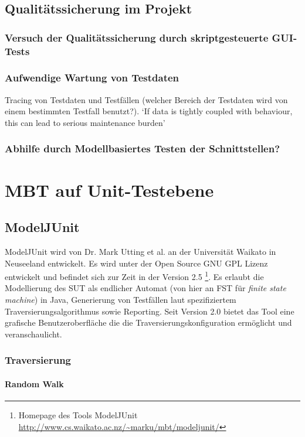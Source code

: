 \subsection{Qualitätssicherung im Projekt}
\subsubsection{Versuch der Qualitätssicherung durch skriptgesteuerte GUI-Tests}
\subsubsection{Aufwendige Wartung von Testdaten}
Tracing von Testdaten und Testfällen (welcher Bereich der Testdaten wird von einem bestimmten Testfall benutzt?). `If data is tightly coupled with behaviour, this can lead to serious maintenance burden' \cite{baker_model-driven_2005} 
\subsubsection{Abhilfe durch Modellbasiertes Testen der Schnittstellen?}


\section{MBT auf Unit-Testebene}
\subsection{ModelJUnit}
ModelJUnit wird von Dr. Mark Utting et al. an der Universität Waikato in Neuseeland entwickelt. Es wird unter der Open Source GNU GPL Lizenz entwickelt und befindet sich zur Zeit in der Version 2.5 \footnote{Homepage des Tools ModelJUnit \url{http://www.cs.waikato.ac.nz/~marku/mbt/modeljunit/}}. Es erlaubt die Modellierung des SUT als endlicher Automat (von hier an FST für \textit{finite state machine}) in Java, Generierung von Testfällen laut spezifiziertem Traversierungsalgorithmus sowie Reporting. Seit Version 2.0 bietet das Tool eine grafische Benutzeroberfläche die die Traversierungskonfiguration ermöglicht und veranschaulicht.\\

\subsubsection{Traversierung}
\paragraph{Random Walk}
